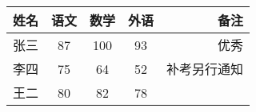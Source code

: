 \documentclass{article}
\begin{document}
	\begin{tabular}{l | c c c r} %
		\hline
		姓名 & 语文 &数学 &外语 &备注  \\
		\hline
		张三 & 87 & 100 & 93 & 优秀 \\
		李四 & 75 & 64 & 52 & 补考另行通知 \\
		王二 & 80 & 82 & 78 \\
	\end{tabular}
\end{document}
